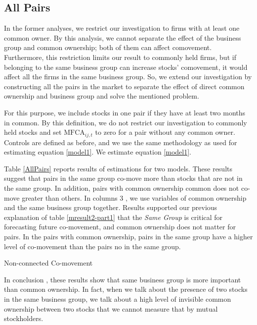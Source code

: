				
				\FloatBarrier
				
				\subsection{All Pairs}
				
					In the former analyses, we restrict our investigation to firms with at least one common owner. By this analysis, we cannot separate the effect of the business group and common ownership; both of them can affect comovement. Furthermore, this restriction limits our result to commonly held firms, but if belonging to the same business group can increase stocks' comovement, it would affect all the firms in the same business group. 
					So, we extend our investigation by constructing all the pairs in the market to separate the effect of direct common ownership and business group and solve the mentioned problem. 
					
					For this purpose, we include stocks in one pair if they have at least two months in common. By this definition, we do not restrict our investigation to commonly held stocks and set $\text{MFCA}_{ij,t}$ to zero for a pair without any common owner. Controls are defined as before, and we use the same methodology as used for estimating equation \ref{model1}. We estimate equation \ref{model1}. 
					
					Table \ref{AllPairs} reports results of estimations for two models. These results suggest that pairs in the same group co-move more than stocks that are not in the same group. In addition, pairs with common ownership common does not co-move greater than others. In columns 3 , we use variables of common ownership and the same business group together. Results supported our previous explanation of table \ref{mresult2-part1} that the \textit{Same Group} is critical for forecasting future co-movement, and common ownership does not matter for pairs. In the pairs with common ownership, pairs in the same group have a higher level of co-movement than the pairs no in the same group.
					
					{\begin{table}[htbp]
							\caption{Non-connected Co-movement}
							\label{AllPairs}
							\resizebox{1\textwidth}{!}{
								
									{	
									}
							}
					\end{table}}
					
				
					
					
					
					In conclusion , these results show that same business group is more important than common ownership. In fact, when we talk about the presence of two stocks in the same business group, we talk about a high level of invisible common ownership between two stocks that we cannot measure that by mutual stockholders.
					
					
					\FloatBarrier
